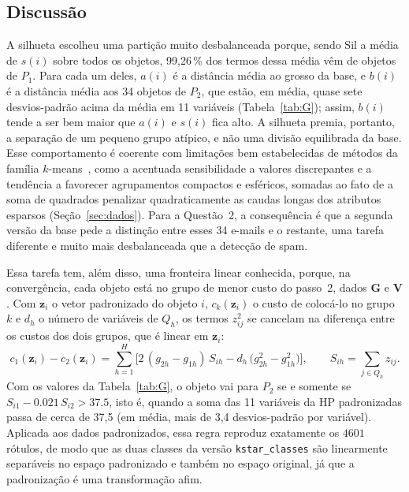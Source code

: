 \documentclass[11pt,a4paper]{article}
\newcommand{\Sil}{\mathrm{Sil}}
\begin{document}
\subsection{Discussão}\label{sec:q1-discussao}

A silhueta escolheu uma partição muito desbalanceada porque, sendo $\Sil$ a média de $s(i)$ sobre todos os objetos, 99,26\,\% dos termos dessa média 
vêm de objetos de $P_1$. Para cada um deles, $a(i)$ é a distância média ao grosso da base, e $b(i)$ é a distância média aos 34 objetos de $P_2$, 
que estão, em média, quase sete desvios-padrão acima da média em 11 variáveis (Tabela~\ref{tab:G}); assim, $b(i)$ tende a ser bem maior que $a(i)$ 
e $s(i)$ fica alto. A silhueta premia, portanto, a separação de um pequeno grupo atípico, e não uma divisão equilibrada da base. Esse comportamento é 
coerente com limitações bem estabelecidas de métodos da família $k$-means~\cite{vichi2001double,hastie2009elements}, como a acentuada sensibilidade a 
valores discrepantes e a tendência a favorecer agrupamentos compactos e esféricos, somadas ao fato de a soma de quadrados penalizar quadraticamente as
caudas longas dos atributos esparsos (Seção~\ref{sec:dados}). Para a Questão~2, a consequência é que a segunda versão da base pede a distinção entre 
esses 34 e-mails e o restante, uma tarefa diferente e muito mais desbalanceada que a detecção de spam.

Essa tarefa tem, além disso, uma fronteira linear conhecida, porque, na convergência, cada objeto está no grupo de menor custo do passo~2, 
dados $\mathbf{G}$ e $\mathbf{V}$. Com $\mathbf{z}_i$ o vetor padronizado do objeto $i$, $c_k(\mathbf{z}_i)$ o custo de colocá-lo no grupo $k$ e $d_h$ 
o número de variáveis de $Q_h$, os termos $z_{ij}^2$ se cancelam na diferença entre os custos dos dois grupos, que é linear em $\mathbf{z}_i$:
\begin{equation}
c_1(\mathbf{z}_i)-c_2(\mathbf{z}_i)=\sum_{h=1}^{H}\Big[2\,(g_{2h}-g_{1h})\,S_{ih}-d_h\,\big(g_{2h}^2-g_{1h}^2\big)\Big],
\qquad S_{ih}=\sum_{j\in Q_h}z_{ij}.
\label{eq:fronteira}
\end{equation}
Com os valores da Tabela~\ref{tab:G}, o objeto vai para $P_2$ se e somente se $S_{i1}-\num{0.021}\,S_{i2}>\num{37.5}$,
isto é, quando a soma das 11 variáveis da HP padronizadas passa de cerca de 37,5 (em média, mais de 3,4
desvios-padrão por variável). Aplicada aos dados padronizados, essa regra reproduz exatamente os $\num{4601}$
rótulos, de modo que as duas classes da versão \texttt{kstar\_classes} são linearmente separáveis no espaço
padronizado e também no espaço original, já que a padronização é uma transformação afim.
\end{document}
